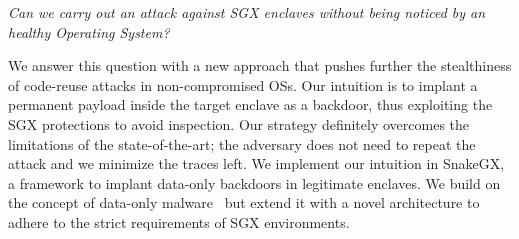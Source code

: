 \emph{Can we carry out an attack against SGX enclaves without being 
	noticed by an healthy Operating System?}

We answer this question with a new approach that pushes further the 
stealthiness of code-reuse attacks in non-compromised OSs.
Our intuition is to implant a permanent payload inside the target 
enclave as a backdoor, thus exploiting the SGX protections to avoid 
inspection.
%
Our strategy definitely overcomes the limitations of the state-of-the-art;
the adversary does not need to repeat the attack and we minimize the 
traces left.
%
We implement our intuition in SnakeGX, a framework to implant
data-only backdoors in legitimate enclaves. 
We build on the concept of data-only
malware~\cite{vogl2014persistent} but extend it with a novel
architecture to adhere to the strict requirements of SGX environments.

